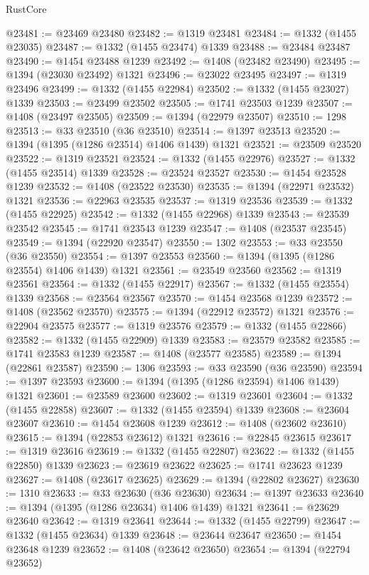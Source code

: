 \begin{lexlean}{RustCore}
\begin{coremodule}
@23481 := @23469 @23480
@23482 := @1319 @23481
@23484 := @1332 (@1455 @23035)
@23487 := @1332 (@1455 @23474) @1339
@23488 := @23484 @23487
@23490 := @1454 @23488 @1239
@23492 := @1408 (@23482 @23490)
@23495 := @1394 (@23030 @23492) @1321
@23496 := @23022 @23495
@23497 := @1319 @23496
@23499 := @1332 (@1455 @22984)
@23502 := @1332 (@1455 @23027) @1339
@23503 := @23499 @23502
@23505 := @1741 @23503 @1239
@23507 := @1408 (@23497 @23505)
@23509 := @1394 (@22979 @23507)
@23510 := 1298
@23513 := @33 @23510 (@36 @23510)
@23514 := @1397 @23513
@23520 := @1394 (@1395 (@1286 @23514) @1406 @1439) @1321
@23521 := @23509 @23520
@23522 := @1319 @23521
@23524 := @1332 (@1455 @22976)
@23527 := @1332 (@1455 @23514) @1339
@23528 := @23524 @23527
@23530 := @1454 @23528 @1239
@23532 := @1408 (@23522 @23530)
@23535 := @1394 (@22971 @23532) @1321
@23536 := @22963 @23535
@23537 := @1319 @23536
@23539 := @1332 (@1455 @22925)
@23542 := @1332 (@1455 @22968) @1339
@23543 := @23539 @23542
@23545 := @1741 @23543 @1239
@23547 := @1408 (@23537 @23545)
@23549 := @1394 (@22920 @23547)
@23550 := 1302
@23553 := @33 @23550 (@36 @23550)
@23554 := @1397 @23553
@23560 := @1394 (@1395 (@1286 @23554) @1406 @1439) @1321
@23561 := @23549 @23560
@23562 := @1319 @23561
@23564 := @1332 (@1455 @22917)
@23567 := @1332 (@1455 @23554) @1339
@23568 := @23564 @23567
@23570 := @1454 @23568 @1239
@23572 := @1408 (@23562 @23570)
@23575 := @1394 (@22912 @23572) @1321
@23576 := @22904 @23575
@23577 := @1319 @23576
@23579 := @1332 (@1455 @22866)
@23582 := @1332 (@1455 @22909) @1339
@23583 := @23579 @23582
@23585 := @1741 @23583 @1239
@23587 := @1408 (@23577 @23585)
@23589 := @1394 (@22861 @23587)
@23590 := 1306
@23593 := @33 @23590 (@36 @23590)
@23594 := @1397 @23593
@23600 := @1394 (@1395 (@1286 @23594) @1406 @1439) @1321
@23601 := @23589 @23600
@23602 := @1319 @23601
@23604 := @1332 (@1455 @22858)
@23607 := @1332 (@1455 @23594) @1339
@23608 := @23604 @23607
@23610 := @1454 @23608 @1239
@23612 := @1408 (@23602 @23610)
@23615 := @1394 (@22853 @23612) @1321
@23616 := @22845 @23615
@23617 := @1319 @23616
@23619 := @1332 (@1455 @22807)
@23622 := @1332 (@1455 @22850) @1339
@23623 := @23619 @23622
@23625 := @1741 @23623 @1239
@23627 := @1408 (@23617 @23625)
@23629 := @1394 (@22802 @23627)
@23630 := 1310
@23633 := @33 @23630 (@36 @23630)
@23634 := @1397 @23633
@23640 := @1394 (@1395 (@1286 @23634) @1406 @1439) @1321
@23641 := @23629 @23640
@23642 := @1319 @23641
@23644 := @1332 (@1455 @22799)
@23647 := @1332 (@1455 @23634) @1339
@23648 := @23644 @23647
@23650 := @1454 @23648 @1239
@23652 := @1408 (@23642 @23650)
@23654 := @1394 (@22794 @23652)

\end{coremodule}
\end{lexlean}
